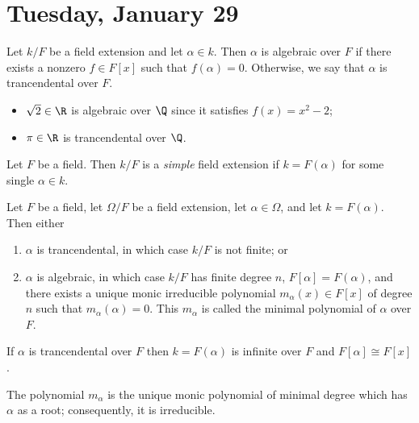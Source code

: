 
\section{Tuesday, January 29}

\begin{definition}[Algebraic]
Let $k/F$ be a field extension and let $\alpha \in k$. Then $\alpha$ is algebraic over $F$ if there exists a nonzero $f \in F[x]$ such that $f(\alpha) = 0$. Otherwise, we say that $\alpha$ is trancendental over $F$.
\begin{itemize}
\item $\sqrt{2} \in \R$ is algebraic over $\Q$ since it satisfies $f(x) = x^2-2$;
\item $\pi \in \R$ is trancendental over $\Q$.
\end{itemize}
\end{definition}

\begin{definition}
Let $F$ be a field. Then $k/F$ is a \emph{simple} field extension if $k = F(\alpha)$ for some single $\alpha \in k$. 
\end{definition}

\begin{theorem}
Let $F$ be a field, let $\Omega/F$ be a field extension, let $\alpha \in \Omega$, and let $k = F(\alpha)$. Then either 
\begin{enumerate}
\item $\alpha$ is trancendental, in which case $k/F$ is not finite; or
\item $\alpha$ is algebraic, in which case $k/F$ has finite degree $n$, $F[\alpha] = F(\alpha)$, and there exists a unique monic irreducible polynomial $m_\alpha(x) \in F[x]$ of degree $n$ such that $m_\alpha(\alpha) = 0$. This $m_\alpha$ is called the minimal polynomial of $\alpha$ over $F$.
\end{enumerate}
\end{theorem}

\begin{lemma}
If $\alpha$ is trancendental over $F$ then $k = F(\alpha)$ is infinite over $F$ and $F[\alpha] \cong F[x]$.
\end{lemma}

\begin{lemma}\label{lemma:minimal}
The polynomial $m_\alpha$ is the unique monic polynomial of minimal degree which has $\alpha$ as a root; consequently, it is irreducible.
\end{lemma}

